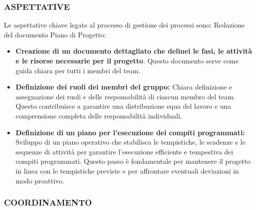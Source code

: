 \documentclass{article}
\begin{document}
\subsubsection{ASPETTATIVE}
Le aspettative chiave legate al processo di gestione dei processi sono:
Redazione del documento Piano di Progetto:
\begin{itemize}
    \item \textbf{Creazione di un documento dettagliato che delinei le fasi, le attività e le risorse necessarie per il progetto}. Questo documento serve come guida chiara per tutti i membri del team.
    \item \textbf{Definizione dei ruoli dei membri del gruppo:}
Chiara definizione e assegnazione dei ruoli e delle responsabilità di ciascun membro del team. Questo contribuisce a garantire una distribuzione equa del lavoro e una comprensione completa delle responsabilità individuali.
    \item \textbf{Definizione di un piano per l'esecuzione dei compiti programmati:}
Sviluppo di un piano operativo che stabilisca le tempistiche, le scadenze e le sequenze di attività per garantire l'esecuzione efficiente e tempestiva dei compiti programmati. Questo passo è fondamentale per mantenere il progetto in linea con le tempistiche previste e per affrontare eventuali deviazioni in modo proattivo.
\end{itemize}



\subsubsection{COORDINAMENTO}
\end{document}
